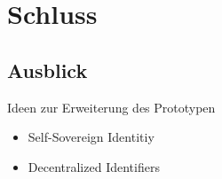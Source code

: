 \section{Schluss}
\label{sec:end}
\subsection{Ausblick}
\label{sec:end_further}
	Ideen zur Erweiterung des Prototypen
	\begin{itemize}
		\item Self-Sovereign Identitiy
		\item Decentralized Identifiers
	\end{itemize}